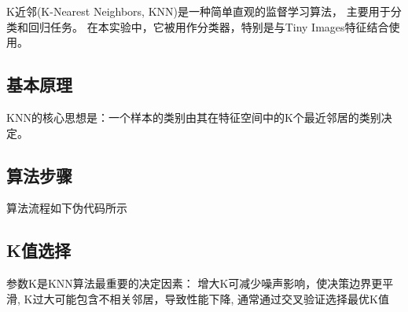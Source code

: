 
K近邻(K-Nearest Neighbors, KNN)是一种简单直观的监督学习算法，
主要用于分类和回归任务。
在本实验中，它被用作分类器，特别是与Tiny Images特征结合使用。

\subsection{基本原理}
KNN的核心思想是：一个样本的类别由其在特征空间中的K个最近邻居的类别决定。

\subsection{算法步骤}
算法流程如下伪代码所示


\subsection{K值选择}
参数K是KNN算法最重要的决定因素：
增大K可减少噪声影响，使决策边界更平滑,
K过大可能包含不相关邻居，导致性能下降,
通常通过交叉验证选择最优K值





